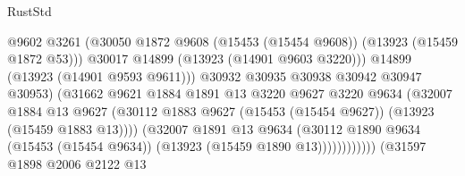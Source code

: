 \begin{lexlean}{RustStd}
\begin{coremodule}
                                              @9602
                                              @3261
                                              (@30050
                                                @1872
                                                @9608
                                                (@15453 (@15454 @9608))
                                                (@13923 (@15459 @1872 @53)))
                                              @30017
                                              @14899
                                              (@13923 (@14901 @9603 @3220)))
                                            @14899
                                            (@13923 (@14901 @9593 @9611)))
                                          @30932
                                          @30935
                                          @30938
                                          @30942
                                          @30947
                                          @30953)
                                        (@31662
                                          @9621
                                          @1884
                                          @1891
                                          @13
                                          @3220
                                          @9627
                                          @3220
                                          @9634
                                          (@32007
                                            @1884
                                            @13
                                            @9627
                                            (@30112
                                              @1883
                                              @9627
                                              (@15453 (@15454 @9627))
                                              (@13923 (@15459 @1883 @13))))
                                          (@32007
                                            @1891
                                            @13
                                            @9634
                                            (@30112
                                              @1890
                                              @9634
                                              (@15453 (@15454 @9634))
                                              (@13923 (@15459 @1890 @13))))))))))))
                          (@31597
                            @1898
                            @2006
                            @2122
                            @13

\end{coremodule}
\end{lexlean}
